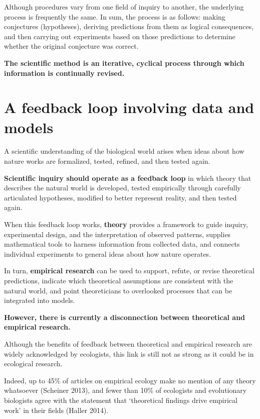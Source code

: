 \documentclass[
]{book}
\theoremstyle{definition}
\theoremstyle{definition}
\theoremstyle{definition}
\theoremstyle{definition}
\theoremstyle{remark}
\begin{document}
Although procedures vary from one field of inquiry to another, the underlying process is frequently the same. In sum, the process is as follows: making conjectures (hypotheses), deriving predictions from them as logical consequences, and then carrying out experiments based on those predictions to determine whether the original conjecture was correct.

\textbf{The scientific method is an iterative, cyclical process through which information is continually revised.}

\section{A feedback loop involving data and models}\label{a-feedback-loop-involving-data-and-models}

A scientific understanding of the biological world arises when ideas about how nature works are formalized, tested, refined, and then tested again.

\textbf{Scientific inquiry should operate as a feedback loop} in which theory that describes the natural world is developed, tested empirically through carefully articulated hypotheses, modified to better represent reality, and then tested again.

When this feedback loop works, \textbf{theory} provides a framework to guide inquiry, experimental design, and the interpretation of observed patterns, supplies mathematical tools to harness information from collected data, and connects individual experiments to general ideas about how nature operates.

In turn, \textbf{empirical research} can be used to support, refute, or revise theoretical predictions, indicate which theoretical assumptions are consistent with the natural world, and point theoreticians to overlooked processes that can be integrated into models.

\textbf{However, there is currently a disconnection between theoretical and empirical research.}

Although the benefits of feedback between theoretical and empirical research are widely acknowledged by ecologists, this link is still not as strong as it could be in ecological research.

Indeed, up to 45\% of articles on empirical ecology make no mention of any theory whatsoever (Scheiner 2013), and fewer than 10\% of ecologists and evolutionary biologists agree with the statement that `theoretical findings drive empirical work' in their fields (Haller 2014).
\end{document}
